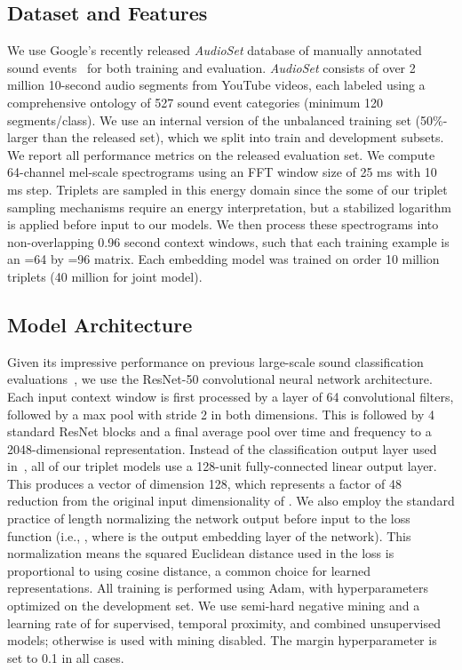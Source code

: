\documentclass{article}
\begin{document}
\subsection{Dataset and Features}

We use Google's recently released \emph{AudioSet} database of manually annotated
sound events~\cite{audioset} for both training and evaluation. \emph{AudioSet}
consists of over 2 million 10-second audio segments from YouTube videos, each
labeled using a comprehensive ontology of 527 sound event categories (minimum
120 segments/class). We use an internal version of the unbalanced training set
(50\%-larger than the released set), which we split into train and development
subsets.  We report all performance metrics on the released evaluation set.  We
compute 64-channel mel-scale spectrograms using an FFT window size of 25 ms with
10 ms step.  Triplets are sampled in this energy domain since the some of our
triplet sampling mechanisms require an energy interpretation, but a stabilized
logarithm is applied before input to our models.  We then process these
spectrograms into non-overlapping 0.96 second context windows, such that each
training example is an =64 by =96 matrix. Each embedding model was trained
on order 10 million triplets (40 million for joint model).

\subsection{Model Architecture}

Given its impressive performance on previous large-scale sound classification
evaluations~\cite{hershey2017cnn}, we use the ResNet-50 convolutional neural
network architecture.  Each input  context window is first
processed by a layer of 64 convolutional  filters, followed by a
 max pool with stride 2 in both dimensions.  This is followed by 4
standard ResNet blocks and a final average pool over time and frequency to a
2048-dimensional representation.  Instead of the classification output layer
used in~\cite{hershey2017cnn}, all of our triplet models use a 128-unit
fully-connected linear output layer. This produces a vector of dimension
128, which represents a factor of 48 reduction from the original input
dimensionality of . We also employ the standard practice of
length normalizing the network output before input to the loss function (i.e.,
, where  is the output embedding layer of the network). This
normalization means the squared Euclidean distance used in the loss is
proportional to using cosine distance, a common choice for learned
representations. All training is performed using Adam, with hyperparameters
optimized on the development set.  We use semi-hard negative mining and a
learning rate of  for supervised, temporal proximity, and combined
unsupervised models; otherwise  is used with mining disabled.  The
margin hyperparameter  is set to 0.1 in all cases.
\end{document}
